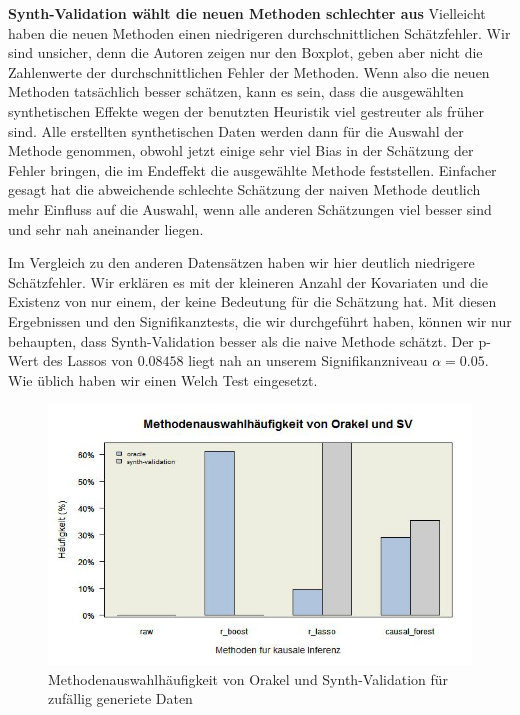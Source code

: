 \documentclass[12pt,a4paper,twoside]{scrartcl}
\numberwithin{equation}{section}
\begin{document}
\noindent
\textbf{Synth-Validation wählt die neuen Methoden schlechter aus} Vielleicht haben die neuen Methoden einen niedrigeren durchschnittlichen Schätzfehler. Wir sind unsicher, denn die Autoren zeigen nur den Boxplot, geben aber nicht die Zahlenwerte der durchschnittlichen Fehler der Methoden. Wenn also die neuen Methoden tatsächlich besser schätzen, kann es sein, dass die ausgewählten synthetischen Effekte wegen der benutzten Heuristik viel gestreuter als früher sind. Alle erstellten synthetischen Daten werden dann für die Auswahl der Methode genommen, obwohl jetzt einige sehr viel Bias in der Schätzung der Fehler bringen, die im Endeffekt die ausgewählte Methode feststellen. Einfacher gesagt hat die abweichende schlechte Schätzung der naiven Methode deutlich mehr Einfluss auf die Auswahl, wenn alle anderen Schätzungen viel besser sind und sehr nah aneinander liegen. 
\par

\noindent
Im Vergleich zu den anderen Datensätzen haben wir hier deutlich niedrigere Schätzfehler. Wir erklären es mit der kleineren Anzahl der Kovariaten und die Existenz von nur einem, der keine Bedeutung für die Schätzung hat. Mit diesen Ergebnissen und den Signifikanztests, die wir durchgeführt haben, können wir nur behaupten, dass Synth-Validation besser als die naive Methode schätzt. Der p-Wert des Lassos von $0.08458$ liegt nah an unserem Signifikanzniveau $\alpha=0.05$. Wie üblich haben wir einen Welch Test eingesetzt.\par

\begin{center}
\begin{figure}[h]
    \centering
    \includegraphics[height=0.5\textwidth, width=1\textwidth]{figures/plots/randomBarplot.jpeg}
    \caption[Methodenauswahlhäufigkeit von Orakel und Synth-Validation für zufällig generiete Daten]{Methodenauswahlhäufigkeit von Orakel und Synth-Validation für zufällig generiete Daten}\label{fig:randomBarplot}
  \end{figure}
\end{center}
\end{document}
